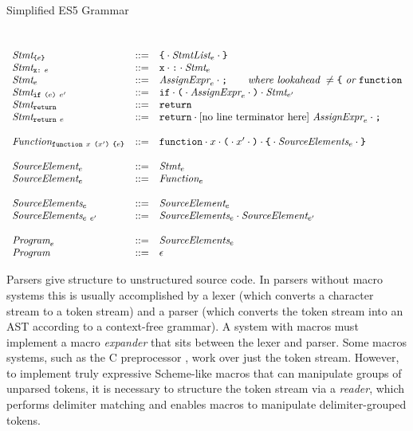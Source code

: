 \documentclass[preprint,10pt]{sigplanconf}
\begin{document}
\begin{displayfigure*}{\label{fig:grammar}Simplified ES5 Grammar}
\[\begin{array}{lcl}
  \\ \\
  \textit{Stmt}_{\texttt{\{} e \texttt{\}}} &::=& 
  \texttt{\{} \cdot \textit{StmtList}_{e}\cdot \texttt{\}}
  \\
  \textit{Stmt}_{\texttt{x}\texttt{:}~e} &::=&
  \texttt{x}\cdot \texttt{:}\cdot\textit{Stmt}_{e}
  \\
  \textit{Stmt}_{e} &::=& 
  \textit{AssignExpr}_{e} \cdot \texttt{;}
  \qquad \textit{where lookahead}~\not = 
    \texttt{\{}~\textit{or}~\texttt{function}
  \\
  \textit{Stmt}_{\texttt{if}~\texttt{(}e \texttt{)}~e'} &::=& 
  \texttt{if}\cdot 
  \texttt{(}\cdot \textit{AssignExpr}_{e} \cdot \texttt{)}\cdot \textit{Stmt}_{e'}
  \\
  \textit{Stmt}_{\texttt{return}} &::=& 
  \texttt{return}
  \\
  \textit{Stmt}_{\texttt{return}~e} &::=& 
  \texttt{return}\cdot \textrm{[no line terminator
    here]}~\textit{AssignExpr}_{e}\cdot \texttt{;}
  \\ \\
  \textit{Function}_{\texttt{function}~x~ \texttt{(}x' \texttt{)}~\texttt{\{}e \texttt{\}}} 
  &::=&
  \texttt{function} \cdot x \cdot 
  \texttt{(} \cdot x' \cdot \texttt{)}\cdot
  \texttt{\{}\cdot \textit{SourceElements}_{e} \cdot \texttt{\}}
  \\ \\
  \textit{SourceElement}_{e} &::=& \textit{Stmt}_{e} 
  \\
  \textit{SourceElement}_{e} &::=& \textit{Function}_{e}
  \\ \\

  \textit{SourceElements}_{e} &::=& \textit{SourceElement}_{e}
  \\
  \textit{SourceElements}_{e~e'} &::=&
  \textit{SourceElements}_{e}\cdot \textit{SourceElement}_{e'}
  \\ \\
  \textit{Program}_{e} &::=& \textit{SourceElements}_{e}
  \\
  \textit{Program}_{} &::=& \epsilon
\end{array}
\]  
\end{displayfigure*}

Parsers give structure to unstructured source code. In parsers without
macro systems this is usually accomplished by a lexer (which converts
a character stream to a token stream) and a parser (which converts the
token stream into an AST according to a context-free grammar). A
system with macros must implement a macro \emph{expander} that sits
between the lexer and parser. Some macros systems, such as the C
preprocessor \cite{Harbison1984}, work over just the token stream.
However, to implement truly
expressive Scheme-like macros that can manipulate groups of unparsed
tokens, it is necessary to structure the token stream via a
\emph{reader}, which performs delimiter matching and enables macros to manipulate delimiter-grouped tokens.
\end{document}

